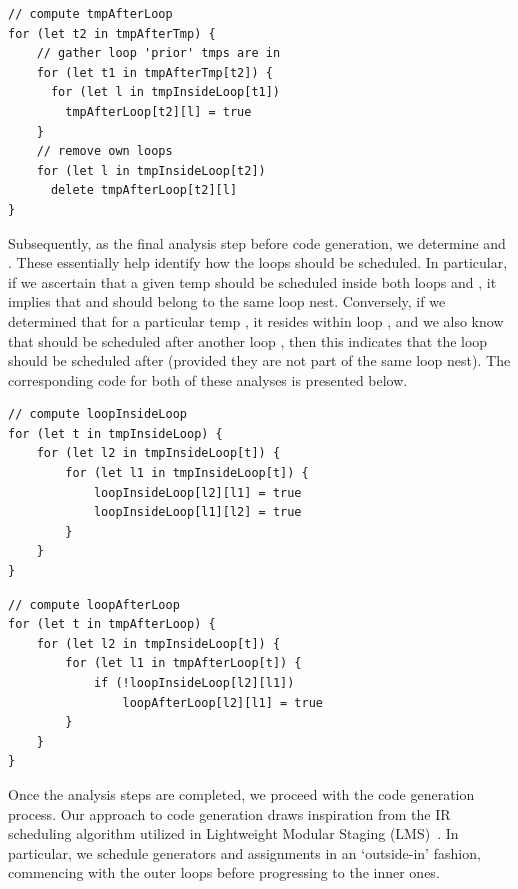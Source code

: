 \documentclass[runningheads]{llncs}
\begin{document}
\begin{lstlisting}[style=JavaScript, columns=flexible]
// compute tmpAfterLoop
for (let t2 in tmpAfterTmp) {
    // gather loop 'prior' tmps are in
    for (let t1 in tmpAfterTmp[t2]) {
      for (let l in tmpInsideLoop[t1])
        tmpAfterLoop[t2][l] = true
    }
    // remove own loops
    for (let l in tmpInsideLoop[t2])
      delete tmpAfterLoop[t2][l]
}
\end{lstlisting}

Subsequently, as the final analysis step before code generation, we determine
 and .
These essentially help identify how the loops should be scheduled.
In particular, if we ascertain that a given temp  should be scheduled
inside both loops  and , it implies that  and
 should belong to the same loop nest.
Conversely, if we determined that for a particular temp ,
it resides within loop , and we also know that  should be
scheduled after another loop , then this indicates that the loop 
should be scheduled after  (provided they are not part of the same loop nest).
The corresponding code for both of these analyses is presented below.

\hspace{-18pt}
\begin{minipage}{0.5\textwidth}
\begin{lstlisting}[style=JavaScript, columns=flexible]
// compute loopInsideLoop
for (let t in tmpInsideLoop) {
    for (let l2 in tmpInsideLoop[t]) {
        for (let l1 in tmpInsideLoop[t]) {
            loopInsideLoop[l2][l1] = true
            loopInsideLoop[l1][l2] = true
        }
    }
}
\end{lstlisting}
\end{minipage}%
\begin{minipage}{0.5\textwidth}
\begin{lstlisting}[style=JavaScript, columns=flexible]
// compute loopAfterLoop
for (let t in tmpAfterLoop) {
    for (let l2 in tmpInsideLoop[t]) {
        for (let l1 in tmpAfterLoop[t]) {
            if (!loopInsideLoop[l2][l1])
                loopAfterLoop[l2][l1] = true
        }
    }
}
\end{lstlisting}
\end{minipage}

Once the analysis steps are completed, we proceed with the code
generation process.
Our approach to code generation draws inspiration from the IR scheduling
algorithm utilized in Lightweight Modular Staging (LMS)~\cite{lms}.
In particular, we schedule generators and assignments in an
`outside-in' fashion, commencing with the outer loops before
progressing to the inner ones.
\end{document}
